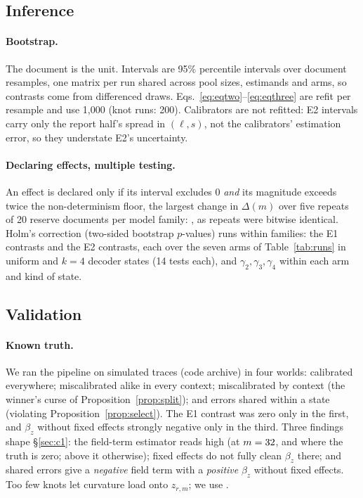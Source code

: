\subsection{Inference}
\label{sec:inference}

\paragraph{Bootstrap.}
The document is the unit. Intervals are 95\% percentile intervals over \VivaNBoot{} document
resamples, one matrix per run shared across pool sizes, estimands and arms, so contrasts
come from differenced draws. Eqs.~\ref{eq:eqtwo}--\ref{eq:eqthree} are refit per resample and use 1,000 (knot runs: 200).
Calibrators are not refitted: E2 intervals carry only the report half's spread in $(\ell,s)$, not
the calibrators' estimation error, so they understate E2's uncertainty.

\paragraph{Declaring effects, multiple testing.}
An effect is declared only if its interval excludes 0 \emph{and} its magnitude exceeds twice
the non-determinism floor, the largest change in $\Delta(m)$ over five repeats of 20
reserve documents per model family: \VivaLladaFloor{}, as repeats were bitwise identical.
Holm's correction (two-sided bootstrap $p$-values) runs within families: the E1 contrasts and the
E2 contrasts, each over the seven arms of Table~\ref{tab:runs} in uniform and $k{=}4$ decoder
states (14 tests each), and $\gamma_2,\gamma_3,\gamma_4$ within each arm and kind of state.

\subsection{Validation}
\label{sec:validation}

\paragraph{Known truth.}
We ran the pipeline on simulated traces (code archive) in four worlds: calibrated everywhere;
miscalibrated alike in every context; miscalibrated by context (the winner's curse of
Proposition~\ref{prop:split}); and errors shared within a state (violating
Proposition~\ref{prop:select}). The E1 contrast was zero only in the first, and $\beta_z$ without
fixed effects strongly negative only in the third. Three findings shape \S\ref{sec:c1}:
the field-term estimator reads high (at $m=32$, \TZeroFieldCalibrated{} and
\TZeroFieldUniform{} where the truth is zero; above it otherwise); fixed effects do
not fully clean $\beta_z$ there; and shared errors give a \emph{negative} field
term with a \emph{positive} $\beta_z$ without fixed effects. Too few knots let curvature load onto $z_{r,m}$; we use \VivaKnots{}.

